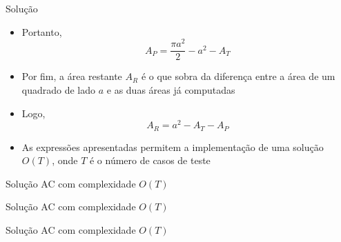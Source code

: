 \begin{frame}[fragile]{Solução}

    \begin{itemize}
        \item Portanto,
        \[
            A_P = \frac{\pi a^2}{2} - a^2 - A_T
        \]
        \pause

        \item Por fim, a área restante $A_R$ é o que sobra da diferença entre a área de um
            quadrado de lado $a$ e as duas áreas já computadas
        \pause

        \item Logo,
        \[
            A_R = a^2 - A_T - A_P
        \]
        \pause

        \item As expressões apresentadas permitem a implementação de uma solução $O(T)$, onde
            $T$ é o número de casos de teste
    \end{itemize}

\end{frame}
\begin{frame}[fragile]{Solução AC com complexidade $O(T)$}
\end{frame}

\begin{frame}[fragile]{Solução AC com complexidade $O(T)$}
\end{frame}

\begin{frame}[fragile]{Solução AC com complexidade $O(T)$}
\end{frame}

